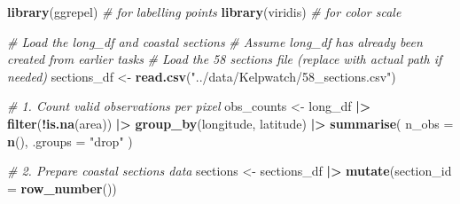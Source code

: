 \documentclass[
  british,
  10pt,
]{article}
\newenvironment{Shaded}{\begin{snugshade}}{\end{snugshade}}
\newcommand{\AttributeTok}[1]{\textcolor[rgb]{0.13,0.29,0.53}{#1}}
\newcommand{\CommentTok}[1]{\textcolor[rgb]{0.56,0.35,0.01}{\textit{#1}}}
\newcommand{\FunctionTok}[1]{\textcolor[rgb]{0.13,0.29,0.53}{\textbf{#1}}}
\newcommand{\NormalTok}[1]{#1}
\newcommand{\OtherTok}[1]{\textcolor[rgb]{0.56,0.35,0.01}{#1}}
\newcommand{\SpecialCharTok}[1]{\textcolor[rgb]{0.81,0.36,0.00}{\textbf{#1}}}
\newcommand{\StringTok}[1]{\textcolor[rgb]{0.31,0.60,0.02}{#1}}
\begin{document}
\begin{Shaded}
\begin{Highlighting}[]
\FunctionTok{library}\NormalTok{(ggrepel)  }\CommentTok{\# for labelling points}
\FunctionTok{library}\NormalTok{(viridis)  }\CommentTok{\# for color scale}

\CommentTok{\# Load the long\_df and coastal sections}
\CommentTok{\# Assume long\_df has already been created from earlier tasks}
\CommentTok{\# Load the 58 sections file (replace with actual path if needed)}
\NormalTok{sections\_df }\OtherTok{\textless{}{-}} \FunctionTok{read.csv}\NormalTok{(}\StringTok{"../data/Kelpwatch/58\_sections.csv"}\NormalTok{)}

\CommentTok{\# 1. Count valid observations per pixel}
\NormalTok{obs\_counts }\OtherTok{\textless{}{-}}\NormalTok{ long\_df }\SpecialCharTok{|\textgreater{}} 
  \FunctionTok{filter}\NormalTok{(}\SpecialCharTok{!}\FunctionTok{is.na}\NormalTok{(area)) }\SpecialCharTok{|\textgreater{}} 
  \FunctionTok{group\_by}\NormalTok{(longitude, latitude) }\SpecialCharTok{|\textgreater{}} 
  \FunctionTok{summarise}\NormalTok{(}
    \AttributeTok{n\_obs =} \FunctionTok{n}\NormalTok{(),}
    \AttributeTok{.groups =} \StringTok{"drop"}
\NormalTok{  )}

\CommentTok{\# 2. Prepare coastal sections data}
\NormalTok{sections }\OtherTok{\textless{}{-}}\NormalTok{ sections\_df }\SpecialCharTok{|\textgreater{}} 
  \FunctionTok{mutate}\NormalTok{(}\AttributeTok{section\_id =} \FunctionTok{row\_number}\NormalTok{())}


\end{Highlighting}
\end{Shaded}
\end{document}
